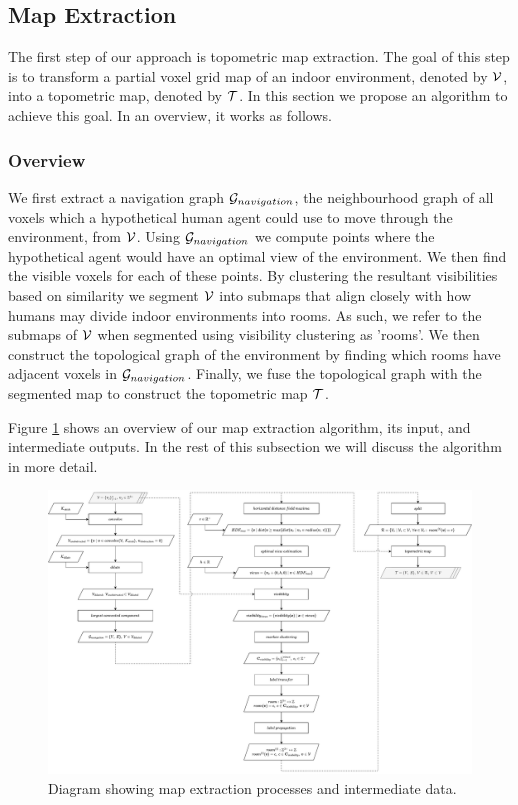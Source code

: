 \subsection{Map Extraction}
The first step of our approach is topometric map extraction.
The goal of this step is to transform a partial voxel grid map of an indoor environment, denoted by \(\mathcal{V}\), into a topometric map, denoted by \(\mathcal{T}\). In this section we propose an algorithm to achieve this goal. In an overview, it works as follows.

\subsubsection{Overview}
We first extract a navigation graph \(\mathcal{G}_{navigation}\), the neighbourhood graph of all voxels which a hypothetical human agent could use to move through the environment, from \(\mathcal{V}\). Using \(\mathcal{G}_{navigation}\) we compute points where the hypothetical agent would have an optimal view of the environment. We then find the visible voxels for each of these points. By clustering the resultant visibilities based on similarity we segment \(\mathcal{V}\) into submaps that align closely with how humans may divide indoor environments into rooms. As such, we refer to the submaps of \(\mathcal{V}\) when segmented using visibility clustering as 'rooms'. We then construct the topological graph of the environment by finding which rooms have adjacent voxels in \(\mathcal{G}_{navigation}\). Finally, we fuse the topological graph with the segmented map to construct the topometric map \(\mathcal{T}\). 

Figure \ref{fig:map_extract_steps} shows an overview of our map extraction algorithm, its input, and intermediate outputs. In the rest of this subsection we will discuss the algorithm in more detail.

\begin{figure}[h]
    \centering
    \includegraphics*[width=1\textwidth]{./fig/flowchart_extract.pdf}
    \caption{Diagram showing map extraction processes and intermediate data.}
    \label{fig:map_extract_steps}
\end{figure}

